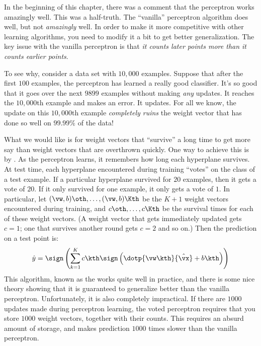 In the beginning of this chapter, there was a comment that the
perceptron works amazingly well.  This was a half-truth.  The
``vanilla'' perceptron algorithm does well, but not \emph{amazingly}
well.  In order to make it more competitive with other learning
algorithms, you need to modify it a bit to get better generalization.
The key issue with the vanilla perceptron is that \emph{it counts
  later points more than it counts earlier points}.

To see why, consider a data set with $10,000$ examples.  Suppose that
after the first $100$ examples, the perceptron has learned a really
good classifier.  It's so good that it goes over the next $9899$
examples without making \emph{any} updates.  It reaches the $10,000$th
example and makes an error.  It updates.  For all we know, the update
on this $10,000$th example \emph{completely ruins} the weight vector
that has done so well on $99.99\%$ of the data!

What we would like is for weight vectors that ``survive'' a long time
to get more say than weight vectors that are overthrown quickly.  One
way to achieve this is by .  As the perceptron learns,
it remembers how long each hyperplane survives.  At test time, each
hyperplane encountered during training ``votes'' on the class of a
test example.  If a particular hyperplane survived for $20$ examples,
then it gets a vote of $20$.  If it only survived for one example, it
only gets a vote of $1$.  In particular, let $(\vw,b)\oth, \dots,
(\vw,b)\Kth$ be the $K+1$ weight vectors encountered during training,
and $c\oth, \dots, c\Kth$ be the survival times for each of these
weight vectors.  (A weight vector that gets immediately updated gets
$c=1$; one that survives another round gets $c=2$ and so on.)  Then
the prediction on a test point is:
\begin{equation} \label{eq:perc:vote}
  \hat y = \sign \left(
    \sum_{k=1}^K c\kth
      \sign \left(
        \dotp{\vw\kth}{\hat\vx} + b\kth
        \right)
      \right)
\end{equation}
This algorithm, known as the  works quite
well in practice, and there is some nice theory showing that it is
guaranteed to generalize better than the vanilla perceptron.
Unfortunately, it is also completely impractical.  If there are $1000$
updates made during perceptron learning, the voted perceptron requires
that you store $1000$ weight vectors, together with their counts.
This requires an absurd amount of storage, and makes prediction $1000$
times slower than the vanilla perceptron.

